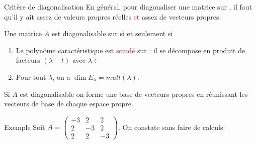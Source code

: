 \begin{parag}{Critère de diagonalisation}
    En général, pour diagonaliser une matrice sur \R, il faut qu'il y ait assez de valeurs propres réelles \textcolor{red}{et} assez de vecteurs propres.
    \begin{theoreme}
        Une matrice $A$ est diagonalisable sur \R si et seulement si 
        \begin{enumerate}
            \item Le polynôme caractéristique est \textcolor{red}{scindé} sur \R : il se décompose en produit de facteurs $(\lambda - t)$ avec $\lambda \in $ \R
            \item Pour tout $\lambda$, on a $\dim E_\lambda = mult(\lambda)$.
        \end{enumerate}
    \end{theoreme}
    Si $A$ est diagonalisable on forme une base de vecteurs propres en réunissant les vecteurs de base de chaque espace propre.
    \begin{subparag}{Exemple}
        Soit $A = \begin{pmatrix}
            -3 & 2 & 2\\
            2 & -3 & 2\\
            2 & 2 & -3
        \end{pmatrix}$. On constate sans faire de calculs:
\end{subparag}
\end{parag}
